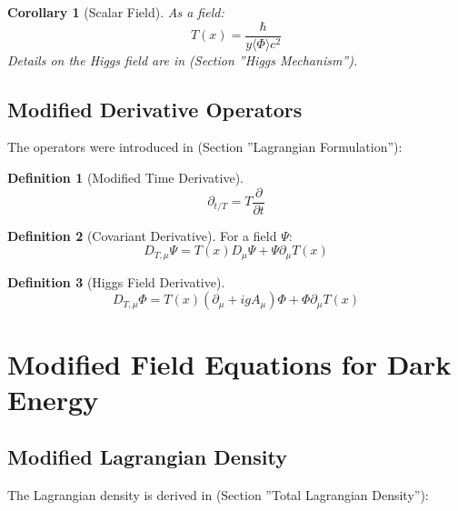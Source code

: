 \documentclass[a4paper,12pt]{article}
\newtheorem{corollary}[theorem]{Corollary}
\theoremstyle{definition}
\newtheorem{definition}{Definition}[theorem]
\theoremstyle{remark}
\newcommand{\Tfield}{T(x)}
\newcommand{\DhiggsT}{\Tfield (\partial_\mu + ig A_\mu) \Phi + \Phi \partial_\mu \Tfield}
\begin{document}
	\begin{corollary}[Scalar Field]
		As a field:
		\begin{equation}
			\Tfield = \frac{\hbar}{y \langle\Phi\rangle c^2}
		\end{equation}
		Details on the Higgs field are in \cite{pascher_higgs_2025} (Section ''Higgs Mechanism'').
	\end{corollary}
	
	\subsection{Modified Derivative Operators}
	
	The operators were introduced in \cite{pascher_lagrange_2025} (Section ''Lagrangian Formulation''):
	
	\begin{definition}[Modified Time Derivative]
		\begin{equation}
			\partial_{t/T} = T \frac{\partial}{\partial t}
		\end{equation}
	\end{definition}
	
	\begin{definition}[Covariant Derivative]
		For a field \(\Psi\):
		\begin{equation}
			D_{T,\mu} \Psi = \Tfield D_\mu \Psi + \Psi \partial_\mu \Tfield
		\end{equation}
	\end{definition}
	
	\begin{definition}[Higgs Field Derivative]
		\begin{equation}
			D_{T,\mu} \Phi = \DhiggsT
		\end{equation}
	\end{definition}
	
	\section{Modified Field Equations for Dark Energy}
	
	\subsection{Modified Lagrangian Density}
	
	The Lagrangian density is derived in \cite{pascher_lagrange_2025} (Section ''Total Lagrangian Density''):
	
\end{document}
